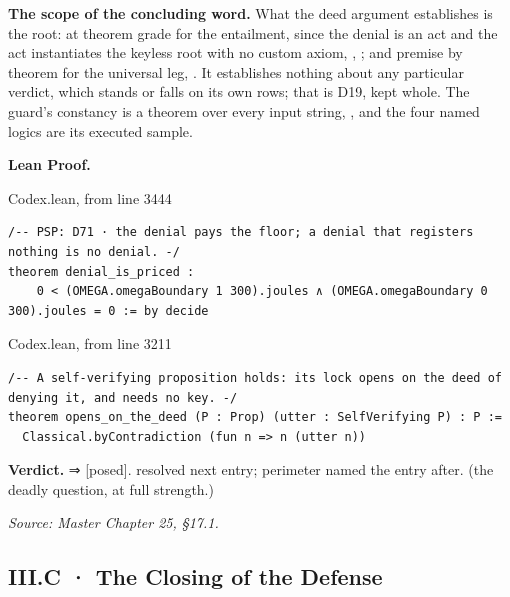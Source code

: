 \documentclass[10pt,twocolumn]{article}
\begin{document}
\textbf{The scope of the concluding word.} What the deed argument
establishes is the root: at theorem grade for the entailment, since the
denial is an act and the act instantiates the keyless root with no
custom axiom, \texttt{},
\texttt{}; and premise by theorem
for the universal leg, \texttt{}. It
establishes nothing about any particular verdict, which stands or falls
on its own rows; that is D19, kept whole. The guard's constancy is a
theorem over every input string,
\texttt{}, and the four named logics are
its executed sample.

\textbf{Lean Proof.}

\begin{leanexcerpt}{Codex.lean, from line 3444}
\begin{lstlisting}[style=leanx,firstnumber=3444]
/-- PSP: D71 · the denial pays the floor; a denial that registers nothing is no denial. -/
theorem denial_is_priced :
    0 < (OMEGA.omegaBoundary 1 300).joules ∧ (OMEGA.omegaBoundary 0 300).joules = 0 := by decide
\end{lstlisting}
\end{leanexcerpt}

\begin{leanexcerpt}{Codex.lean, from line 3211}
\begin{lstlisting}[style=leanx,firstnumber=3211]
/-- A self-verifying proposition holds: its lock opens on the deed of denying it, and needs no key. -/
theorem opens_on_the_deed (P : Prop) (utter : SelfVerifying P) : P :=
  Classical.byContradiction (fun n => n (utter n))
\end{lstlisting}
\end{leanexcerpt}

\textbf{Verdict.} ⇒ {[}posed{]}. resolved next entry; perimeter named
the entry after. (the deadly question, at full strength.)

\emph{Source: Master Chapter 25, §17.1.}

\hypertarget{iii.c-the-closing-of-the-defense}{%
\subsection{III.C · The Closing of the
Defense}\label{iii.c-the-closing-of-the-defense}}
\end{document}
